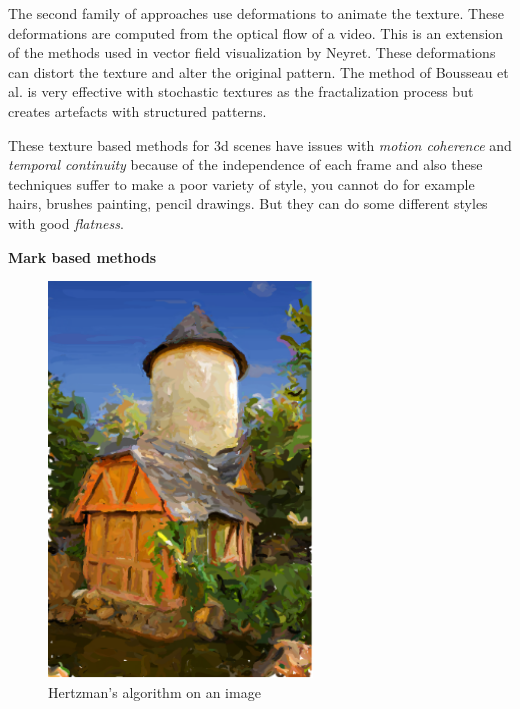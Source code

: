The second family of approaches use deformations to animate the texture\cite{bousseau_video_2007}. These deformations are computed from the optical flow of a video. This is an extension of the methods used in vector field visualization by Neyret\cite{neyret_imagis-gravir_nodate}. These deformations can distort the texture and alter the original pattern. The method of Bousseau et al.\cite{bousseau_video_2007} is very effective with stochastic textures as the fractalization process but creates artefacts with structured patterns. \newline

These texture based methods for 3d scenes have issues with \textit{motion coherence} and \textit{temporal continuity} because of the independence of each frame and also these techniques suffer to make a poor variety of style, you cannot do for example hairs, brushes painting, pencil drawings. But they can do some different styles with good \textit{flatness}.\newline

\textbf{Mark based methods}

\begin{figure}
    \begin{center}

    \includegraphics[scale=0.5]{pics/hertzmann_algo.png}
    \end{center}
    \caption{Hertzman's algorithm on an image \cite{rosin_stroke_2013}}
    \label{Hertzman_algo}
\end{figure}

